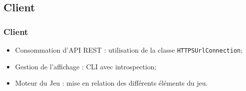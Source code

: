 \subsection{Client}
	\begin{frame}
		\frametitle{Client}
		\begin{itemize}
			\item Consommation d'API REST : utilisation de la classe \texttt{HTTPSUrlConnection}; \newline
			\item Gestion de l'affichage : CLI avec introspection; \newline
			\item Moteur du Jeu : mise en relation des différents éléments du jeu.
		\end{itemize}
	\end{frame}
